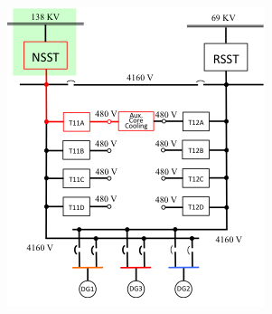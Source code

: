 \begin{figure}
\begin{subfigure}[b]{0.3\textwidth}
                \includegraphics[width=\textwidth]{figures/ACpowerRecPath138kV.png}
                \caption{}
                \label{fig:ACpower138kV}
        \end{subfigure}
        ~ %
        \begin{subfigure}[b]{0.3\textwidth}
                \centering

\end{subfigure}
\end{figure}
